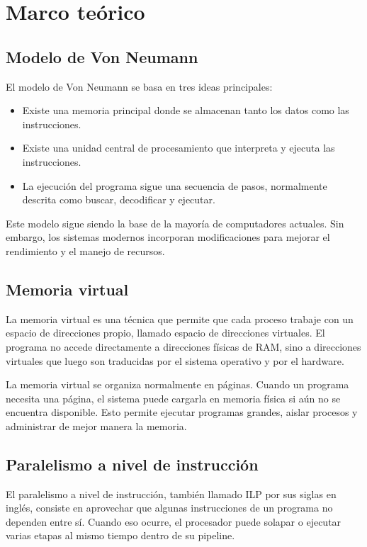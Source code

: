 \documentclass[11pt,a4paper]{article}
\begin{document}
\section{Marco teórico}

\subsection{Modelo de Von Neumann}

El modelo de Von Neumann se basa en tres ideas principales:

\begin{itemize}
\item Existe una memoria principal donde se almacenan tanto los datos como las instrucciones.
\item Existe una unidad central de procesamiento que interpreta y ejecuta las instrucciones.
\item La ejecución del programa sigue una secuencia de pasos, normalmente descrita como buscar, decodificar y ejecutar.
\end{itemize}

Este modelo sigue siendo la base de la mayoría de computadores actuales. Sin embargo, los sistemas modernos incorporan modificaciones para mejorar el rendimiento y el manejo de recursos.

\subsection{Memoria virtual}

La memoria virtual es una técnica que permite que cada proceso trabaje con un espacio de direcciones propio, llamado espacio de direcciones virtuales. El programa no accede directamente a direcciones físicas de RAM, sino a direcciones virtuales que luego son traducidas por el sistema operativo y por el hardware.

La memoria virtual se organiza normalmente en páginas. Cuando un programa necesita una página, el sistema puede cargarla en memoria física si aún no se encuentra disponible. Esto permite ejecutar programas grandes, aislar procesos y administrar de mejor manera la memoria.

\subsection{Paralelismo a nivel de instrucción}

El paralelismo a nivel de instrucción, también llamado ILP por sus siglas en inglés, consiste en aprovechar que algunas instrucciones de un programa no dependen entre sí. Cuando eso ocurre, el procesador puede solapar o ejecutar varias etapas al mismo tiempo dentro de su pipeline.
\end{document}
